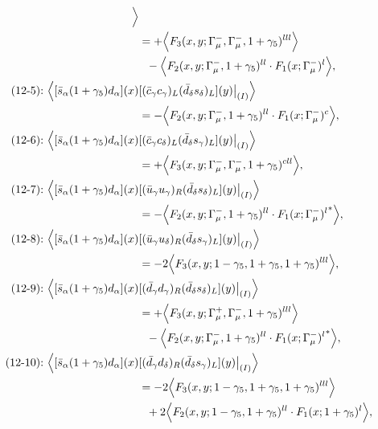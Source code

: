\begin{align}
\Big\rangle
\notag\\*
&=
 + \Big\langle F_3(x,y;\Gamma_\mu^-,\Gamma_\mu^-,1+\gamma_5)^{lll}\Big\rangle
\notag\\*&\ \ 
 - \Big\langle F_2(x,y;\Gamma_\mu^-,1+\gamma_5)^{ll} \cdot F_1(x;\Gamma_\mu^-)^l\Big\rangle,
\\
\mbox{(12-5):}\ 
\Big\langle
[\bar s_\alpha (1 + \gamma_5) d_\alpha](x)&
[(\bar c_\gamma c_\gamma)_L(\bar d_\delta s_\delta)_L](y)\big|_{(I)}
\Big\rangle
\notag\\*
&=
 - \Big\langle F_2(x,y;\Gamma_\mu^-,1+\gamma_5)^{ll} \cdot F_1(x;\Gamma_\mu^-)^c\Big\rangle,
\\
\mbox{(12-6):}\ 
\Big\langle
[\bar s_\alpha (1 + \gamma_5) d_\alpha](x)&
[(\bar c_\gamma c_\delta)_L(\bar d_\delta s_\gamma)_L](y)\big|_{(I)}
\Big\rangle
\notag\\*
&=
 + \Big\langle F_3(x,y;\Gamma_\mu^-,\Gamma_\mu^-,1+\gamma_5)^{cll}\Big\rangle,
\\
\mbox{(12-7):}\ 
\Big\langle
[\bar s_\alpha (1 + \gamma_5) d_\alpha](x)&
[(\bar u_\gamma u_\gamma)_R(\bar d_\delta s_\delta)_L](y)\big|_{(I)}
\Big\rangle
\notag\\*
&=
 - \Big\langle F_2(x,y;\Gamma_\mu^-,1+\gamma_5)^{ll} \cdot {F_1(x;\Gamma_\mu^-)^l}^*\Big\rangle,
\\
\mbox{(12-8):}\ 
\Big\langle
[\bar s_\alpha (1 + \gamma_5) d_\alpha](x)&
[(\bar u_\gamma u_\delta)_R(\bar d_\delta s_\gamma)_L](y)\big|_{(I)}
\Big\rangle
\notag\\*
&=
-2\Big\langle F_3(x,y;1-\gamma_5,1+\gamma_5,1+\gamma_5)^{lll}\Big\rangle,
\\
\mbox{(12-9):}\ 
\Big\langle
[\bar s_\alpha (1 + \gamma_5) d_\alpha](x)&
[(\bar d_\gamma d_\gamma)_R(\bar d_\delta s_\delta)_L](y)\big|_{(I)}
\Big\rangle
\notag\\*
&=
 + \Big\langle F_3(x,y;\Gamma_\mu^+,\Gamma_\mu^-,1+\gamma_5)^{lll}\Big\rangle
\notag\\*&\ \ 
 - \Big\langle F_2(x,y;\Gamma_\mu^-,1+\gamma_5)^{ll} \cdot {F_1(x;\Gamma_\mu^-)^l}^*\Big\rangle,
\\
\mbox{(12-10):}\ 
\Big\langle
[\bar s_\alpha (1 + \gamma_5) d_\alpha](x)&
[(\bar d_\gamma d_\delta)_R(\bar d_\delta s_\gamma)_L](y)\big|_{(I)}
\Big\rangle
\notag\\*
&=
-2\Big\langle F_3(x,y;1-\gamma_5,1+\gamma_5,1+\gamma_5)^{lll}\Big\rangle
\notag\\*&\ \ 
 + 2\Big\langle F_2(x,y;1-\gamma_5,1+\gamma_5)^{ll} \cdot F_1(x;1+\gamma_5)^l\Big\rangle,
\\

\end{align}
